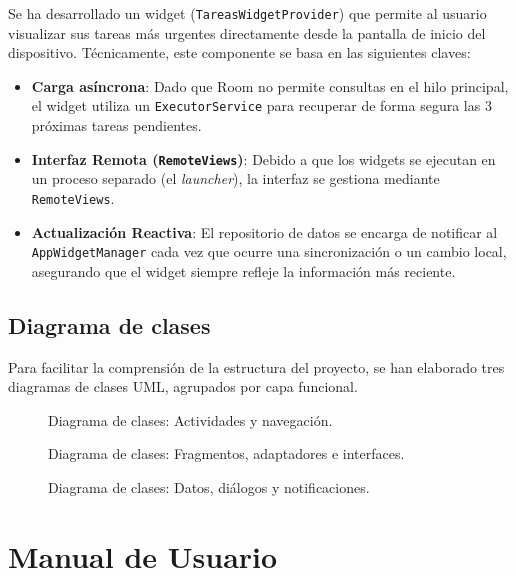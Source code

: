 \documentclass{article}
\begin{document}
Se ha desarrollado un widget (\texttt{TareasWidgetProvider}) que permite al usuario visualizar sus tareas más urgentes directamente desde la pantalla de inicio del dispositivo. Técnicamente, este componente se basa en las siguientes claves:
\begin{itemize}
    \item \textbf{Carga asíncrona}: Dado que Room no permite consultas en el hilo principal, el widget utiliza un \texttt{ExecutorService} para recuperar de forma segura las 3 próximas tareas pendientes.
    \item \textbf{Interfaz Remota (\texttt{RemoteViews})}: Debido a que los widgets se ejecutan en un proceso separado (el \textit{launcher}), la interfaz se gestiona mediante \texttt{RemoteViews}.
    \item \textbf{Actualización Reactiva}: El repositorio de datos se encarga de notificar al \texttt{AppWidgetManager} cada vez que ocurre una sincronización o un cambio local, asegurando que el widget siempre refleje la información más reciente.
\end{itemize}

\subsection{Diagrama de clases}

Para facilitar la comprensión de la estructura del proyecto, se han elaborado tres diagramas de clases UML, agrupados por capa funcional.

\begin{figure}[H]
    \centering
    
    \caption{Diagrama de clases: Actividades y navegación.}
\end{figure}

\begin{figure}[H]
    \centering
    
    \caption{Diagrama de clases: Fragmentos, adaptadores e interfaces.}
\end{figure}

\begin{figure}[H]
    \centering
    
    \caption{Diagrama de clases: Datos, diálogos y notificaciones.}
\end{figure}

\newpage

\section{Manual de Usuario}
\end{document}
